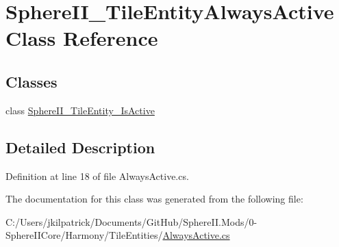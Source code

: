 \hypertarget{class_sphere_i_i___tile_entity_always_active}{}\section{Sphere\+I\+I\+\_\+\+Tile\+Entity\+Always\+Active Class Reference}
\label{class_sphere_i_i___tile_entity_always_active}
\subsection*{Classes}
\begin{DoxyCompactItemize}
\item 
class \mbox{\hyperlink{class_sphere_i_i___tile_entity_always_active_1_1_sphere_i_i___tile_entity___is_active}{Sphere\+I\+I\+\_\+\+Tile\+Entity\+\_\+\+Is\+Active}}
\end{DoxyCompactItemize}


\subsection{Detailed Description}


Definition at line 18 of file Always\+Active.\+cs.



The documentation for this class was generated from the following file\+:\begin{DoxyCompactItemize}
\item 
C\+:/\+Users/jkilpatrick/\+Documents/\+Git\+Hub/\+Sphere\+I\+I.\+Mods/0-\/\+Sphere\+I\+I\+Core/\+Harmony/\+Tile\+Entities/\mbox{\hyperlink{_always_active_8cs}{Always\+Active.\+cs}}\end{DoxyCompactItemize}
